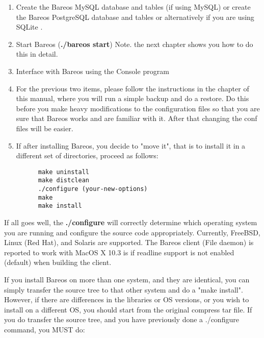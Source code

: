 \begin{enumerate}
\label{CreateDatabase}
\item Create the Bareos MySQL database and tables
   (if using MySQL)
       or
      create the Bareos PostgreSQL database and tables
    or alternatively  if you are using
   SQLite .

\item Start Bareos ({\bf ./bareos start}) Note. the next chapter  shows you
   how to do this in detail.

\item Interface with Bareos using the Console program

\item For the previous two items, please follow the instructions  in the
    chapter of  this manual,
   where you will run a simple backup and do a  restore. Do this before you make
   heavy modifications to the  configuration files so that you are sure that
   Bareos works  and are familiar with it. After that changing the conf files
   will be easier.

\item If after installing Bareos, you decide to "move it", that is  to
   install it in a different set of directories, proceed  as follows:

\footnotesize
\begin{verbatim}
      make uninstall
      make distclean
      ./configure (your-new-options)
      make
      make install

\end{verbatim}
\normalsize

\end{enumerate}

If all goes well, the {\bf ./configure} will correctly determine which
operating system you are running and configure the source code appropriately.
Currently, FreeBSD, Linux (Red Hat), and Solaris are supported. The Bareos
client (File daemon) is reported to work with MacOS X 10.3 is if
readline support is not enabled (default) when building the client.

If you install Bareos on more than one system, and they are identical, you can
simply transfer the source tree to that other system and do a "make
install". However, if there are differences in the libraries or OS versions,
or you wish to install on a different OS, you should start from the original
compress tar file. If you do transfer the source tree, and you have previously
done a ./configure command, you MUST do:

